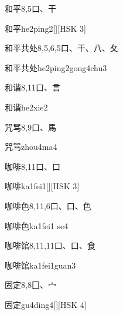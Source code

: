 \begin{entry}{和平}{8,5}{⼝、⼲}
  \begin{phonetics}{和平}{he2ping2}[][HSK 3]
  \end{phonetics}
\end{entry}

\begin{entry}{和平共处}{8,5,6,5}{⼝、⼲、⼋、⼡}
  \begin{phonetics}{和平共处}{he2ping2gong4chu3}
  \end{phonetics}
\end{entry}

\begin{entry}{和谐}{8,11}{⼝、⾔}
  \begin{phonetics}{和谐}{he2xie2}
  \end{phonetics}
\end{entry}

\begin{entry}{咒骂}{8,9}{⼝、⾺}
  \begin{phonetics}{咒骂}{zhou4ma4}
  \end{phonetics}
\end{entry}

\begin{entry}{咖啡}{8,11}{⼝、⼝}
  \begin{phonetics}{咖啡}{ka1fei1}[][HSK 3]
  \end{phonetics}
\end{entry}

\begin{entry}{咖啡色}{8,11,6}{⼝、⼝、⾊}
  \begin{phonetics}{咖啡色}{ka1fei1 se4}
  \end{phonetics}
\end{entry}

\begin{entry}{咖啡馆}{8,11,11}{⼝、⼝、⾷}
  \begin{phonetics}{咖啡馆}{ka1fei1guan3}
  \end{phonetics}
\end{entry}

\begin{entry}{固定}{8,8}{⼞、⼧}
  \begin{phonetics}{固定}{gu4ding4}[][HSK 4]
  \end{phonetics}
\end{entry}

